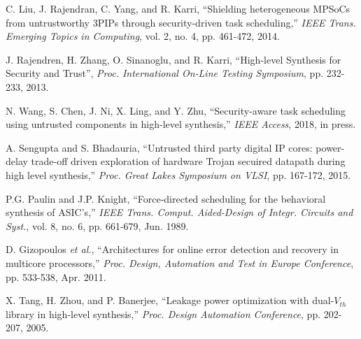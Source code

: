 \documentclass[conference]{IEEEtran}
\begin{document}
\begin{thebibliography}{99}
C. Liu, J. Rajendran, C. Yang, and R. Karri, ``Shielding heterogeneous MPSoCs from untrustworthy 3PIPs through security-driven task scheduling,'' \textit{IEEE Trans. Emerging Topics in Computing}, vol. 2, no. 4, pp. 461-472, 2014.


J. Rajendren, H. Zhang, O. Sinanoglu, and R. Karri, ``High-level Synthesis for Security and Trust'', \textit{Proc. International On-Line Testing Symposium}, pp. 232-233, 2013.

N. Wang, S. Chen, J. Ni, X. Ling, and Y. Zhu, ``Security-aware task scheduling using untrusted components in high-level synthesis,'' \textit{IEEE Access}, 2018, in press.


A. Sengupta and S. Bhadauria, ``Untrusted third party digital IP cores: power-delay trade-off driven exploration of hardware Trojan secuired datapath during high level synthesis,'' \textit{Proc. Great Lakes Symposium on VLSI}, pp. 167-172, 2015.


P.G. Paulin and J.P. Knight, ``Force-directed scheduling for the behavioral synthesis of ASIC's,''  \textit{IEEE Trans. Comput. Aided-Design of Integr. Circuits and Syst.}, vol. 8, no. 6, pp. 661-679, Jun. 1989.


D. Gizopoulos \textit{et al.}, ``Architectures for online error detection and recovery in multicore processors,'' \textit{Proc. Design, Automation and Test in Europe Conference}, pp. 533-538, Apr. 2011.


X. Tang, H. Zhou, and P. Banerjee,  ``Leakage power optimization with dual-$V_{th}$ library in high-level synthesis,'' \textit{Proc. Design Automation Conference}, pp. 202-207, 2005.





\end{thebibliography}

\end{document}
